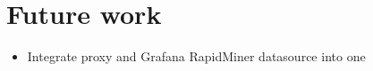 \chapter{Future work}

\begin{itemize}
	\item Integrate proxy and Grafana RapidMiner datasource into one 
\end{itemize}